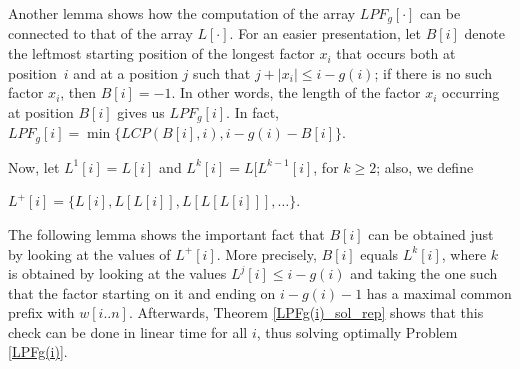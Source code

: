 \documentclass[final]{dmtcs-episciences}
\newcommand{\LCP}{{\mathit{LCP}}}
\newcommand{\LPdF}{{\mathit{LPF}}}
\begin{document}
Another lemma shows how the computation of the array $\LPdF_g[\cdot]$ can be connected to that of the array $L[\cdot]$. For an easier presentation, let $B[i]$ denote the leftmost starting position of the longest factor $x_i$ that occurs both at position~$i$ and at a position $j$ such that $j+|x_i|\leq i-g(i)$; if there is no such factor $x_i$, then $B[i]=-1$. In other words, the length of the factor $x_i$ occurring at position $B[i]$ gives us $\LPdF_g[i]$. In fact, $\LPdF_g[i]=\min\{\LCP(B[i],i), i-g(i) -B[i]\}$. 

Now, let $L^1[i]=L[i]$ and $L^k[i]=L[L^{k-1}[i]$, for $k\geq 2$; also, we define \\
\centerline{$L^+[i]=\{L[i],L[L[i]],L[L[L[i]]],\ldots\}$.} 

The following lemma shows the important fact that $B[i]$ can be obtained just by looking at the values of $L^+[i]$. More precisely, $B[i]$ equals $L^{k}[i]$, where $k$ is obtained by looking at the values $L^j[i]\leq i-g(i)$ and taking the one such that the factor starting on it and ending on $i-g(i)-1$ has a maximal common prefix with $w[i..n]$. Afterwards, Theorem \ref{LPFg(i)_sol_rep} shows that this check can be done in linear time for all $i$, thus solving optimally Problem \ref{LPFg(i)}. 
\end{document}
